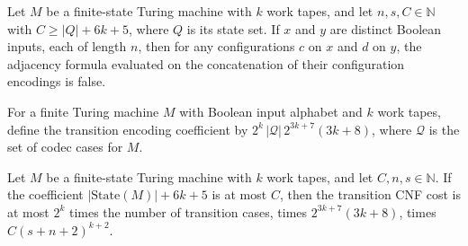 \begin{theorem}
\label{Complexity.configurationAdjacency_reject}
\leanok
{}
Let $M$ be a finite-state Turing machine with $k$ work tapes, and let $n,s,C\in\mathbb
N$ with $C\ge |Q|+6k+5$, where $Q$ is its state set. If $x$ and $y$ are distinct Boolean
inputs, each of length $n$, then for any configurations $c$ on $x$ and $d$ on $y$, the
adjacency formula evaluated on the concatenation of their configuration encodings is
false.
\end{theorem}

\begin{definition}
\label{Complexity.codecTransitionCoefficient}
\leanok
{}
For a finite Turing machine $M$ with Boolean input alphabet and $k$ work tapes, define
the transition encoding coefficient by $2^k\,|\mathcal{Q}|\,2^{3k+7}(3k+8)$, where
$\mathcal{Q}$ is the set of codec cases for $M$.
\end{definition}

\begin{theorem}
\label{Complexity.codecTransitionCNF_cost_poly}
\leanok
{}
Let $M$ be a finite-state Turing machine with $k$ work tapes, and let
$C,n,s\in\mathbb{N}$. If the coefficient $|\mathrm{State}(M)|+6k+5$ is at most $C$, then
the transition CNF cost is at most $2^k$ times the number of transition cases, times
$2^{3k+7}(3k+8)$, times $C(s+n+2)^{k+2}$.
\end{theorem}

